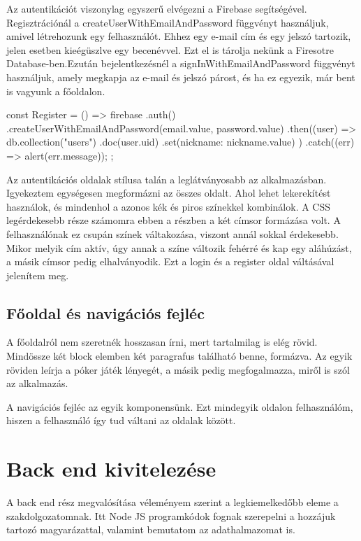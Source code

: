 Az autentikációt viszonylag egyszerű elvégezni a Firebase segítségével. Regisztrációnál a createUserWithEmailAndPassword függvényt használjuk, amivel létrehozunk egy felhasználót. Ehhez egy e-mail cím és egy jelszó tartozik, jelen esetben kieégüszlve egy becenévvel. Ezt el is tárolja nekünk a Firesotre Database-ben.Ezután bejelentkezésnél a signInWithEmailAndPassword függvényt használjuk, amely megkapja az e-mail és jelszó párost, és ha ez egyezik, már bent is vagyunk a főoldalon.

\begin{javascript}
const Register = () => {
      firebase
        .auth()
        .createUserWithEmailAndPassword(email.value, password.value)
        .then((user) => {
          db.collection("users")
            .doc(user.uid)
            .set({nickname: nickname.value})
        })
        .catch((err) => alert(err.message));
    };
\end{javascript}

Az autentikációs oldalak stílusa talán a leglátványosabb az alkalmazásban. Igyekeztem egységesen megformázni az összes oldalt. Ahol lehet lekerekítést használok, és mindenhol a azonos kék és piros színekkel kombinálok. A CSS legérdekesebb része számomra ebben a részben a két címsor formázása volt. A felhasználónak ez csupán színek váltakozása, viszont annál sokkal érdekesebb. Mikor melyik cím aktív, úgy annak a színe változik fehérré és kap egy aláhúzást, a másik címsor pedig elhalványodik. Ezt a login és a register oldal váltásával jelenítem meg.


\subsection{Főoldal és navigációs fejléc}
A főoldalról nem szeretnék hosszasan írni, mert tartalmilag is elég rövid. Mindössze két block elemben két paragrafus található benne, formázva. Az egyik röviden leírja a póker játék lényegét, a másik pedig megfogalmazza, miről is szól az alkalmazás.

A navigációs fejléc az egyik komponensünk. Ezt mindegyik oldalon felhasználóm, hiszen a felhasználó így tud váltani az oldalak között.

\section{Back end kivitelezése}
A back end rész megvalósítása véleményem szerint a legkiemelkedőbb eleme a szakdolgozatomnak. Itt Node JS programkódok fognak szerepelni a hozzájuk tartozó magyarázattal, valamint bemutatom az adathalmazomat is.
